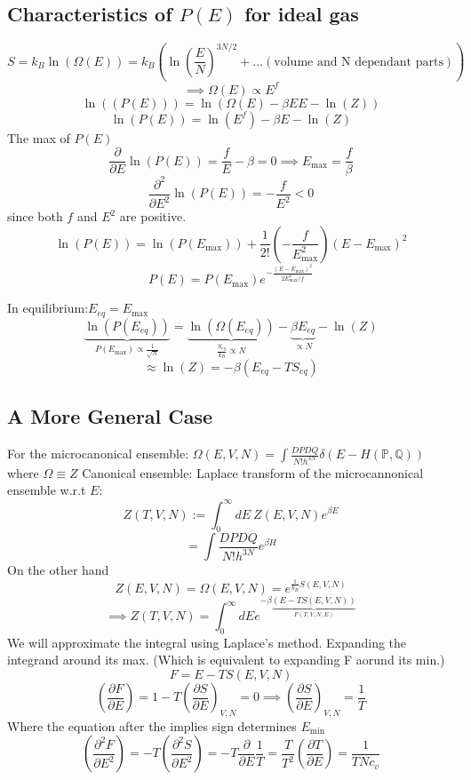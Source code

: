 \documentclass[11pt]{book}
\theoremstyle{definition}
\begin{document}
\subsection{Characteristics of $ P(E) $ for ideal gas}
\[ S = k_B\ln(\Omega(E)) = k_B(\ln(\frac{E}{N})^{3N/2} + ...(\text{volume and N dependant parts} )  )  \]
\[ \implies \Omega(E) \propto E^{f} \] 
\[ \ln((P(E))) = \ln(\Omega(E) - \beta EE - \ln(Z) )  \] 
\[ \ln(P(E)) = \ln(E^{f}) -\beta E - \ln(Z)  \] 
The max of $ P(E) $ 
\[ \frac{\partial }{\partial E} \ln(P(E)) = \frac{f}{E} - \beta = 0 \implies E_{\max} = \frac{f}{\beta} \] 
\[ \frac{\partial ^2}{\partial E^2} \ln(P(E)) = - \frac{f}{E^2} < 0 \] 
since both $ f $ and $ E^2 $ are positive. 
\[ \ln(P(E)) = \ln(P(E_{\max})) + \frac{1}{2!} \left( - \frac{f}{E_{\max}^2} \right)(E-E_{\max})^2  \] 
\[ P(E) = P(E_{\max}) e^{-\frac{(E-E_{\max})^2}{2E_{\max}^2/f}}\] 

In equilibrium:$ E_{eq} = E_{\max} $ 
\[ \underbrace{\ln(P(E_{eq}))}_{P(E_{\max}) \propto \frac{1}{\sqrt{N}}} = \underbrace{\ln(\Omega(E_{eq}))}_{\frac{S_{eq}}{k_B} \propto N} - \underbrace{\beta E_{eq}}_{\propto N}  - \ln(Z)  \] 
\[ \approx \ln(Z) = - \beta \left( E_{eq} - TS_{eq}\right)  \] 
\subsection{A More General Case}
For the microcanonical ensemble: $ \Omega(E,V,N) = \int \frac{DPDQ}{N!h^{3N}} \delta(E-H(\mathbb{P},\mathbb{Q}))$ where $ \Omega \equiv Z $ 
Canonical ensemble: Laplace transform of the microcannonical ensemble w.r.t $ E $:
\[ Z(T,V,N) := \int_{{0}}^{{\infty}} d{E} \: {Z(E,V,N)} e^{\beta E}\] 
\[ = \int \frac{DPDQ}{N!h^{3N}} e^{\beta H}\] 
On the other hand
\[ Z(E,V,N) = \Omega(E,V,N) = e^{\frac{1}{k_B}S(E,V,N)} \] 
\[ \implies Z(T,V,N) = \int_0^{\infty} dE e^{-\beta \underbrace{(E-TS(E,V,N))}_{F(T,V,N,E)}}\] 
We will approximate the integral using Laplace's method. Expanding the integrand around its max. (Which is equivalent to expanding F aorund its min.)
\[ F = E-TS(E,V,N) \] 
\[ \left( \frac{\partial F}{\partial E} \right) = 1 - T \left( \frac{\partial S}{\partial E} \right)_{V,N} = 0 \implies \left( \frac{\partial S}{\partial E} \right)_{V,N} = \frac{1}{T}  \] 
Where the equation after the implies sign determines $ E_{\min} $ 
\[ \left( \frac{\partial ^2F}{\partial E^2} \right) = - T \left( \frac{\partial ^2S}{\partial E^2} \right) = -T \frac{\partial }{\partial E} \frac{1}{T} = \frac{T}{T^2}\left( \frac{\partial T}{\partial E} \right) = \frac{1}{TNc_v} \] 
\end{document}
